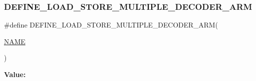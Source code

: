 \subsubsection{\texorpdfstring{D\+E\+F\+I\+N\+E\+\_\+\+L\+O\+A\+D\+\_\+\+S\+T\+O\+R\+E\+\_\+\+M\+U\+L\+T\+I\+P\+L\+E\+\_\+\+D\+E\+C\+O\+D\+E\+R\+\_\+\+A\+RM}{DEFINE\_LOAD\_STORE\_MULTIPLE\_DECODER\_ARM}}
{\footnotesize\ttfamily \#define D\+E\+F\+I\+N\+E\+\_\+\+L\+O\+A\+D\+\_\+\+S\+T\+O\+R\+E\+\_\+\+M\+U\+L\+T\+I\+P\+L\+E\+\_\+\+D\+E\+C\+O\+D\+E\+R\+\_\+\+A\+RM(\begin{DoxyParamCaption}\item[{}]{\mbox{\hyperlink{inflate_8h_a164ea0159d5f0b5f12a646f25f99eceaa67bc2ced260a8e43805d2480a785d312}{N\+A\+ME}} }\end{DoxyParamCaption})}

{\bfseries Value\+:}
